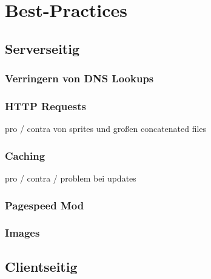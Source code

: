 \section{Best-Practices} %
\label{sec:best_practices}

	\subsection{Serverseitig}
	\label{sub:serverseitig}

		\subsubsection{Verringern von DNS Lookups} %
		\label{ssub:verringern_von_dns_lookups}
		

		\subsubsection{HTTP Requests} %
		\label{ssub:http_requests}
		pro / contra von sprites und großen concatenated files

		\subsubsection{Caching} %
		\label{ssub:caching}
		pro / contra / problem bei updates

		\subsubsection{Pagespeed Mod} %
		\label{ssub:pagespeed_mod}
		

		\subsubsection{Images} %
		\label{ssub:images}





	\subsection{Clientseitig}
	\label{sub:clientseitig}
	

